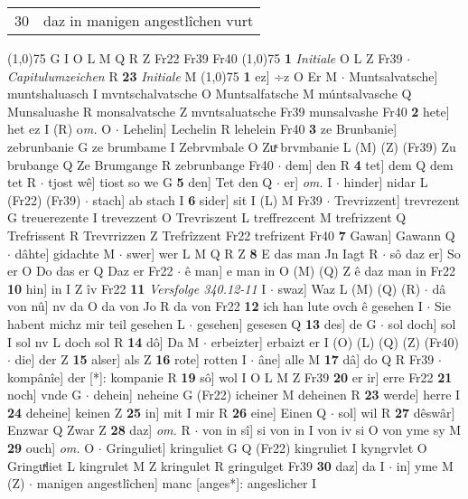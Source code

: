 \documentclass[8pt,a4paper,notitlepage]{article}
\begin{document}
\begin{table}[ht]
\begin{minipage}[t]{0.5\linewidth}
\begin{tabular}{rl}
30 & daz in manigen angestlîchen vurt\\ 
\end{tabular}
\scriptsize
\line(1,0){75} \newline
G I O L M Q R Z Fr22 Fr39 Fr40 \newline
\line(1,0){75} \newline
\textbf{1} \textit{Initiale} O L Z Fr39   $\cdot$ \textit{Capitulumzeichen} R  \textbf{23} \textit{Initiale} M  \newline
\line(1,0){75} \newline
\textbf{1} ez] ÷z O Er M  $\cdot$ Muntsalvatsche] muntshaluasch I mvntschalvatsche O Muntsalfatsche M múntsalvasche Q Munsaluashe R monsalvatsche Z mvntsaluatsche Fr39 munsalvashe Fr40 \textbf{2} hete] het ez I (R) o\textit{m. } O  $\cdot$ Lehelin] Lechelin R lehelein Fr40 \textbf{3} ze Brunbanie] zebrunbanie G ze brumbame I Zebrvmbale O Zuͯ brvmbanie L (M) (Z) (Fr39) Zu brubange Q Ze Brumgange R zebrunbange Fr40  $\cdot$ dem] den R \textbf{4} tet] dem Q dem tet R  $\cdot$ tjost wê] tiost so we G \textbf{5} den] Tet den Q  $\cdot$ er] \textit{om.} I  $\cdot$ hinder] nidar L (Fr22) (Fr39)  $\cdot$ stach] ab stach I \textbf{6} sider] sit I (L) M Fr39  $\cdot$ Trevrizzent] trevrezent G treuerezente I trevezzent O Trevriszent L treffrezcent M trefrizzent Q Trefrissent R Trevrrizzen Z Trefrîzzent Fr22 trefrizent Fr40 \textbf{7} Gawan] Gawann Q  $\cdot$ dâhte] gidachte M  $\cdot$ swer] wer L M Q R Z \textbf{8} E das man Jn Iagt R  $\cdot$ sô daz er] So er O Do das er Q Daz er Fr22  $\cdot$ ê man] e man in O (M) (Q) Z ê daz man in Fr22 \textbf{10} hin] in I Z îv Fr22 \textbf{11} \textit{Versfolge 340.12-11} I   $\cdot$ swaz] Waz L (M) (Q) (R)  $\cdot$ dâ von nû] nv da O da von Jo R da von Fr22 \textbf{12} ich han lute ovch ê gesehen I  $\cdot$ Sie habent michz mir teil gesehen L  $\cdot$ gesehen] gesesen Q \textbf{13} des] de G  $\cdot$ sol doch] sol I sol nv L doch sol R \textbf{14} dô] Da M  $\cdot$ erbeizter] erbaizt er I (O) (L) (Q) (Z) (Fr40)  $\cdot$ die] der Z \textbf{15} alser] als Z \textbf{16} rote] rotten I  $\cdot$ âne] alle M \textbf{17} dâ] do Q R Fr39  $\cdot$ kompânîe] der [*]: kompanie R \textbf{19} sô] wol I O L M Z Fr39 \textbf{20} er ir] erre Fr22 \textbf{21} noch] vnde G  $\cdot$ dehein] neheine G (Fr22) icheiner M deheinen R \textbf{23} werde] herre I \textbf{24} deheine] keinen Z \textbf{25} in] mit I mir R \textbf{26} eine] Einen Q  $\cdot$ sol] wil R \textbf{27} dêswâr] Enzwar Q Zwar Z \textbf{28} daz] \textit{om.} R  $\cdot$ von in sî] si von in I von iv si O von yme sy M \textbf{29} ouch] \textit{om.} O  $\cdot$ Gringuliet] kringuliet G Q (Fr22) kingruliet I kyngrvlet O Gringuͯliet L kingrulet M Z kringulet R gringulget Fr39 \textbf{30} daz] da I  $\cdot$ in] yme M (Z)  $\cdot$ manigen angestlîchen] manc [anges*]: angeslicher I \newline

\end{minipage}
\end{table}
\end{document}
